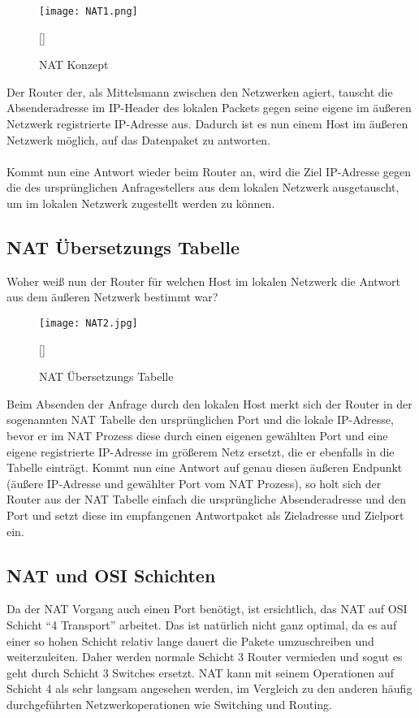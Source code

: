 \newpage
\begin{figure}[h]
    \centering
    \texttt{[image: NAT1.png]}
    \caption[NAT Konzept]{NAT Konzept}[\cite{NATi1}]
\end{figure}
\noindent
Der Router der, als Mittelsmann zwischen den Netzwerken agiert, tauscht die Absenderadresse im IP-Header des lokalen Packets gegen seine eigene im äußeren Netzwerk registrierte IP-Adresse aus. Dadurch ist es nun einem Host im äußeren Netzwerk möglich, auf das Datenpaket zu antworten. 
\\\\
Kommt nun eine Antwort wieder beim Router an, wird die Ziel IP-Adresse gegen die des ursprünglichen Anfragestellers aus dem lokalen Netzwerk ausgetauscht, um im lokalen Netzwerk zugestellt werden zu können.

\newpage
\subsection{NAT Übersetzungs Tabelle}
Woher weiß nun der Router für welchen Host im lokalen Netzwerk die Antwort aus dem äußeren Netzwerk bestimmt war? 
\begin{figure}[h]
    \centering
    \texttt{[image: NAT2.jpg]}
    \caption[NAT Übersetzungs Tabelle]{NAT Übersetzungs Tabelle}[\cite{NATi2}]
\end{figure}
Beim Absenden der Anfrage durch den lokalen Host merkt sich der Router in der sogenannten NAT Tabelle den ursprünglichen Port und die lokale IP-Adresse, bevor er im NAT Prozess diese durch einen eigenen gewählten Port und eine eigene registrierte IP-Adresse im größerem Netz ersetzt, die er ebenfalls in die Tabelle einträgt. 
Kommt nun eine Antwort auf genau diesen äußeren Endpunkt (äußere IP-Adresse und gewählter Port vom NAT Prozess), so holt sich der Router aus der NAT Tabelle einfach die ursprüngliche Absenderadresse und den Port und setzt diese im empfangenen Antwortpaket als Zieladresse und Zielport ein. 
\subsection{NAT und OSI Schichten}
Da der NAT Vorgang auch einen Port benötigt, ist ersichtlich, das NAT auf OSI Schicht “4 Transport” arbeitet. Das ist natürlich nicht ganz optimal, da es auf einer so hohen Schicht relativ lange dauert die Pakete umzuschreiben und weiterzuleiten. Daher werden normale Schicht 3 Router vermieden und sogut es geht durch Schicht 3 Switches ersetzt. NAT kann mit seinem Operationen auf Schicht 4 als sehr langsam angesehen werden, im Vergleich zu den anderen häufig durchgeführten Netzwerkoperationen wie Switching und Routing.

